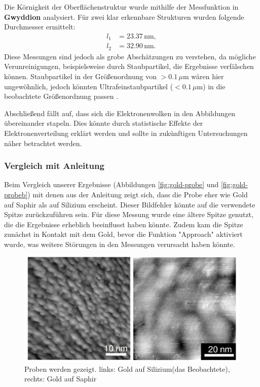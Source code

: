 \documentclass{article}
\begin{document}
Die Körnigkeit der Oberflächenstruktur wurde mithilfe der Messfunktion in \textbf{Gwyddion} analysiert. Für zwei klar erkennbare Strukturen wurden folgende Durchmesser ermittelt:
\begin{align*}
    l_1 &= 23.37 \, \text{nm}, \\
    l_2 &= 32.90 \, \text{nm}.
\end{align*}
Diese Messungen sind jedoch als grobe Abschätzungen zu verstehen, da mögliche Verunreinigungen, beispielsweise durch Staubpartikel, die Ergebnisse verfälschen können. Staubpartikel in der Größenordnung von $>0.1 \, \mu\text{m}$ wären hier ungewöhnlich, jedoch könnten Ultrafeinstaubpartikel ($<0.1 \, \mu\text{m}$) in die beobachtete Größenordnung passen \cite{feinstaub}.

Abschließend fällt auf, dass sich die Elektronenwolken in den Abbildungen übereinander stapeln. Dies könnte durch statistische Effekte der Elektronenverteilung erklärt werden und sollte in zukünftigen Untersuchungen näher betrachtet werden.

\subsubsection*{Vergleich mit Anleitung}

Beim Vergleich unserer Ergebnisse (Abbildungen \ref*{fig:gold-probe} und \ref*{fig:gold-probeb}) mit denen 
aus der Anleitung \cite{Anleitung} zeigt sich, dass die Probe eher wie Gold auf Saphir als auf Silizium erscheint. 
Dieser Bildfehler könnte auf die verwendete Spitze zurückzuführen sein. Für diese Messung wurde eine ältere 
Spitze genutzt, die die Ergebnisse erheblich beeinflusst haben könnte. Zudem kam die Spitze zunächst in Kontakt 
mit dem Gold, bevor die Funktion "Approach" aktiviert wurde, was weitere Störungen in den Messungen verursacht 
haben könnte.


\begin{figure}[h!]
    \centering
    \includegraphics[width=.45\linewidth]{Gold_vergleich}
    \caption{Proben werden gezeigt. links: Gold auf Silizium(das Beobachtete), rechts: Gold auf Saphir}
    \label{fig:goldkugel_vergleich}
  \end{figure}
\end{document}

